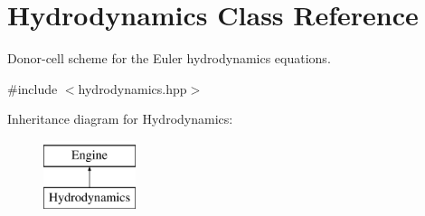 \hypertarget{classHydrodynamics}{}\section{Hydrodynamics Class Reference}
\label{classHydrodynamics}


Donor-\/cell scheme for the Euler hydrodynamics equations.  




{\ttfamily \#include $<$hydrodynamics.\+hpp$>$}

Inheritance diagram for Hydrodynamics\+:\begin{figure}[H]
\begin{center}
\leavevmode
\includegraphics[height=2.000000cm]{classHydrodynamics}
\end{center}
\end{figure}
